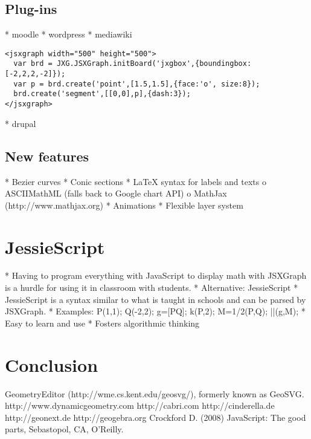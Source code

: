 \documentclass[12pt,a4paper]{article}%
\begin{document}
\subsection{Plug-ins}
    * moodle
    * wordpress
    * mediawiki
\begin{verbatim}
<jsxgraph width="500" height="500">
  var brd = JXG.JSXGraph.initBoard('jxgbox',{boundingbox:[-2,2,2,-2]});
  var p = brd.create('point',[1.5,1.5],{face:'o', size:8});
  brd.create('segment',[[0,0],p],{dash:3});
</jsxgraph>
\end{verbatim}                    
    * drupal 

\subsection{New features}
    * Bezier curves
    * Conic sections
    * \LaTeX{} syntax for labels and texts
          o ASCIIMathML (falls back to Google chart API)
          o MathJax (http://www.mathjax.org)
    * Animations
    * Flexible layer system 

\section{JessieScript}
    * Having to program everything with JavaScript to display math with JSXGraph is a hurdle for using it in classroom with students.
    * Alternative: JessieScript
    * JessieScript is a syntax similar to what is taught in schools and can be parsed by JSXGraph.
    * Examples: P(1,1); Q(-2,2); g=[PQ]; k(P,2); M=1/2(P,Q); ||(g,M);
    * Easy to learn and use
    * Fosters algorithmic thinking 




\section{Conclusion}

\begin{thebibliography}{99}
     GeometryEditor (http://wme.cs.kent.edu/geosvg/), formerly known as GeoSVG.
     http://www.dynamicgeometry.com
     http://cabri.com 
     http://cinderella.de 
     http://geonext.de 
     http://geogebra.org
     Crockford D. (2008) JavaScript: The good parts, Sebastopol, CA, O'Reilly.
\end{thebibliography}
\end{document}
